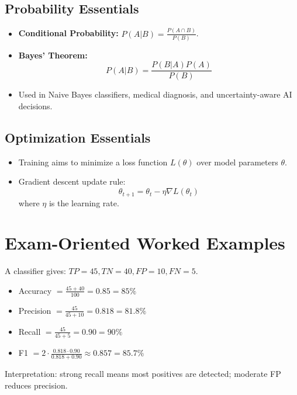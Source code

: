 \documentclass[11pt,a4paper]{article}
\begin{document}
\subsection{Probability Essentials}
\begin{itemize}[leftmargin=*]
  \item \textbf{Conditional Probability:} $P(A|B)=\frac{P(A\cap B)}{P(B)}$.
  \item \textbf{Bayes' Theorem:} 
  $$
  P(A|B)=\frac{P(B|A)P(A)}{P(B)}
  $$
  \item Used in Naive Bayes classifiers, medical diagnosis, and uncertainty-aware AI decisions.
\end{itemize}

\subsection{Optimization Essentials}
\begin{itemize}[leftmargin=*]
  \item Training aims to minimize a loss function $L(\theta)$ over model parameters $\theta$.
  \item Gradient descent update rule:
  $$
  \theta_{t+1}=\theta_t-\eta\nabla L(\theta_t)
  $$
  where $\eta$ is the learning rate.
\end{itemize}

\section{Exam-Oriented Worked Examples}

\begin{examplebox}
A classifier gives: $TP=45, TN=40, FP=10, FN=5$.
\begin{itemize}[leftmargin=*]
  \item Accuracy $=\frac{45+40}{100}=0.85=85\%$
  \item Precision $=\frac{45}{45+10}=0.818=81.8\%$
  \item Recall $=\frac{45}{45+5}=0.90=90\%$
  \item F1 $=2\cdot\frac{0.818\cdot0.90}{0.818+0.90}\approx0.857=85.7\%$
\end{itemize}
Interpretation: strong recall means most positives are detected; moderate FP reduces precision.
\end{examplebox}
\end{document}
